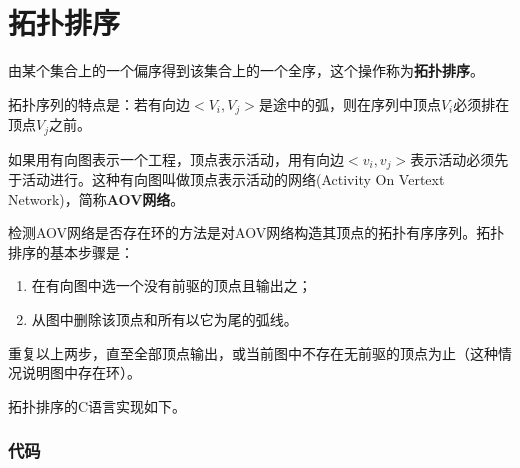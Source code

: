 \section{拓扑排序} %
由某个集合上的一个偏序得到该集合上的一个全序，这个操作称为\textbf{拓扑排序}。

拓扑序列的特点是：若有向边$<V_i, V_j>$是途中的弧，则在序列中顶点$V_i$必须排在顶点$V_j$之前。

如果用有向图表示一个工程，顶点表示活动，用有向边$<v_i,v_j>$表示活动必须先于活动进行。这种有向图叫做顶点表示活动的网络(Activity On Vertext Network)，简称\textbf{AOV网络}。

检测AOV网络是否存在环的方法是对AOV网络构造其顶点的拓扑有序序列。拓扑排序的基本步骤是：
\begin{enumerate}
\item 在有向图中选一个没有前驱的顶点且输出之；
\item 从图中删除该顶点和所有以它为尾的弧线。
\end{enumerate}
重复以上两步，直至全部顶点输出，或当前图中不存在无前驱的顶点为止（这种情况说明图中存在环）。

拓扑排序的C语言实现如下。

\subsubsection{代码}


